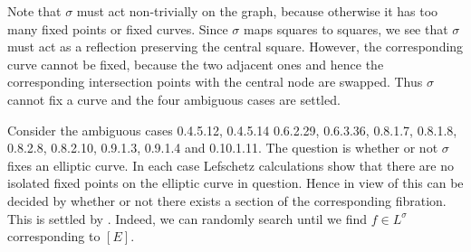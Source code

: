 \documentclass[a4paper]{amsart}
\theoremstyle{definition}
\theoremstyle{plain}
\begin{document}
\begin{center}
\begin{minipage}{10cm}
\end{minipage}
 \end{center}
 Note that $\sigma$ must act non-trivially on the graph, because otherwise it has too many fixed points or fixed curves.
 Since $\sigma$ maps squares to squares, we see that $\sigma$ must act as a reflection preserving the central square.
 However, the corresponding curve cannot be fixed, because the two adjacent ones and hence the corresponding intersection points with the central node are swapped.
 Thus $\sigma$ cannot fix a curve and the four ambiguous cases are settled.

%
%
%
%

Consider the ambiguous cases
0.4.5.12,  0.4.5.14 0.6.2.29, 0.6.3.36, 0.8.1.7, 0.8.1.8, 0.8.2.8, 0.8.2.10, 0.9.1.3, 0.9.1.4 and 0.10.1.11.
The question is whether or not $\sigma$ fixes an elliptic curve.
In each case Lefschetz calculations show that there are no isolated fixed points on the elliptic curve in question. Hence in view of
this can be decided by whether or not there exists a section of the corresponding fibration. This is settled by .
Indeed, we can randomly search until we find $f \in L^\sigma$ corresponding to $[E]$.
\end{document}
